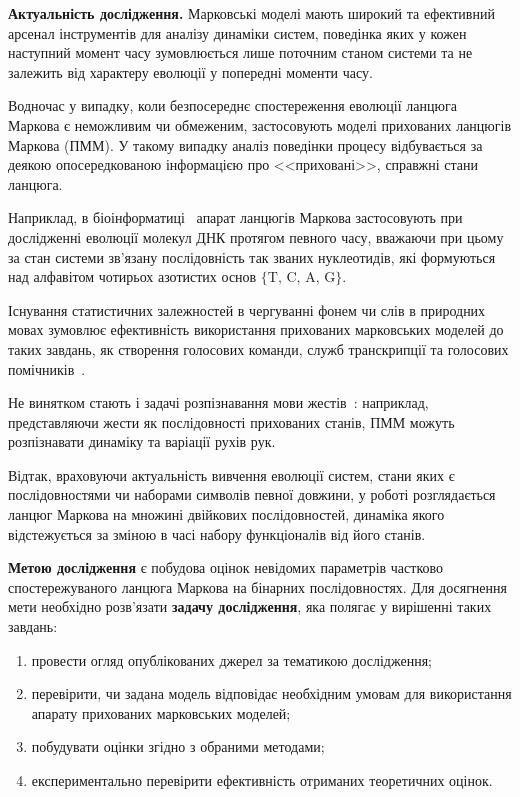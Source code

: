 \textbf{Актуальність дослідження.} Марковські моделі мають широкий та ефективний арсенал інструментів для аналізу динаміки систем, поведінка яких у кожен наступний момент часу зумовлюється лише поточним станом системи та не залежить від характеру еволюції у попередні моменти часу. 

Водночас у випадку, коли безпосереднє спостереження еволюції ланцюга Маркова є неможливим чи обмеженим, застосовують моделі прихованих ланцюгів Маркова (ПММ). У такому випадку аналіз поведінки процесу відбувається за деякою опосередкованою інформацією про <<приховані>>, справжні стани ланцюга. 

Наприклад, в біоінформатиці~\cite[глава 9]{Koski2001} апарат ланцюгів Маркова застосовують при дослідженні еволюції молекул ДНК протягом певного часу, вважаючи при цьому за стан системи зв'язану послідовність так званих нуклеотидів, які формуються над алфавітом чотирьох азотистих основ $\{\text{T, C, A, G} \}$.  

Існування статистичних залежностей в чергуванні фонем чи слів в природних мовах зумовлює ефективність використання прихованих марковських моделей до таких завдань, як створення голосових команди, служб транскрипції та голосових помічників~\cite{Rabiner1989}.

Не винятком стають і задачі розпізнавання мови жестів~\cite{Chaaraoui2013}: наприклад, представляючи жести як послідовності прихованих станів, ПММ можуть розпізнавати динаміку та варіації рухів рук.

Відтак, враховуючи актуальність вивчення еволюції систем, стани яких є послідовностями чи наборами символів певної довжини, у роботі розглядається ланцюг Маркова на множині двійкових послідовностей, динаміка якого відстежується за зміною в часі набору функціоналів від його станів.

\textbf{Метою дослідження} є побудова оцінок невідомих параметрів частково спостережуваного ланцюга Маркова на бінарних послідовностях. Для досягнення мети необхідно розв'язати \textbf{задачу дослідження}, яка полягає у вирішенні таких завдань:

\begin{enumerate}
\item провести огляд опублікованих джерел за тематикою дослідження;
\item перевірити, чи задана модель відповідає необхідним умовам для використання апарату прихованих марковських моделей;
\item побудувати оцінки згідно з обраними методами;
\item експериментально перевірити ефективність отриманих теоретичних оцінок.
\end{enumerate}

